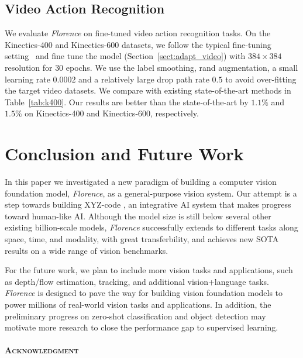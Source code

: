 \documentclass{article}
\begin{document}
\subsection{Video Action Recognition}

We evaluate \emph{Florence} on fine-tuned video action recognition tasks. On the Kinectics-400 and
Kinectics-600 datasets, we follow the typical fine-tuning setting~\cite{liu2021video} and fine tune
the model (Section~\ref{sect:adapt_video}) with $384\times 384$ resolution for $30$ epochs. We use
the label smoothing, rand augmentation, a small learning rate $0.0002$ and a relatively large drop
path rate $0.5$ to avoid over-fitting the target video datasets. We compare with existing
state-of-the-art methods in Table~\ref{tab:k400}. Our results are better than the state-of-the-art
by $1.1\%$ and $1.5\%$ on Kinectics-400 and Kinectics-600, respectively.



\section{Conclusion and Future Work}

In this paper we investigated a new paradigm of building a computer vision foundation model, \emph{Florence}, as a general-purpose vision system. Our attempt is a step towards building XYZ-code \cite{XYZ-code}, an integrative AI system that makes progress toward human-like AI. Although the model size is still below several other existing billion-scale models, \emph{Florence} successfully extends to different tasks along space, time, and modality, with great transferbility, and achieves new SOTA results on a wide range of vision benchmarks.

For the future work, we plan to include more vision tasks and applications, such as depth/flow estimation, tracking, and additional vision+language tasks. \emph{Florence} is designed to pave the way for building vision foundation models to power millions of real-world vision tasks and applications. In addition, the preliminary progress on zero-shot classification and object detection may motivate more research to close the performance gap to supervised learning.

\noindent\paragraph{\textsc{Acknowledgment}}\mbox{}\\
\end{document}
